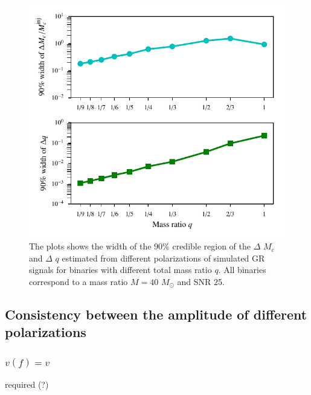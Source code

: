 \documentclass[prd,preprintnumbers,twocolumn,eqsecnum,floatfix,a4paper,nofootinbib,superscriptaddress]{revtex4}
\begin{document}
\begin{figure}[]
    \begin{center}
    \includegraphics[scale=0.75]{figs/hp_hc_consistency_confidence_interval_varying_q.pdf} 
    \end{center} 
    \caption{The plots shows the width of the 90\% credible region of the $\Delta$ $M_{c}$ and $\Delta$ $q$ estimated from different polarizations of simulated GR signals for binaries with different total mass ratio $q$. All binaries correspond to a mass ratio $M=40$ $M_{\odot}$ and SNR 25.}
    \label{fig:hphc_bound_b}
\end{figure}


\newpage

\subsection{Consistency between the amplitude of different polarizations}
\subsubsection{$v(f) = v$}
required (?)
\end{document}
